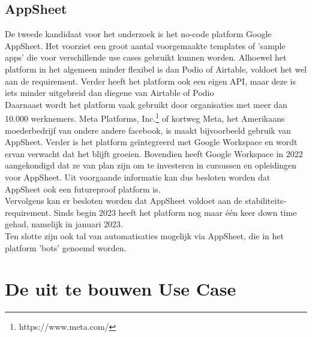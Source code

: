 \subsection{AppSheet} %

De tweede kandidaat voor het onderzoek is het no-code platform Google AppSheet. Het voorziet een groot aantal voorgemaakte templates of 'sample apps' die voor verschillende use cases gebruikt kunnen worden. Alhoewel het platform in het algemeen minder flexibel is dan Podio of Airtable, voldoet het wel aan de requirement. Verder heeft het platform ook een eigen API, maar deze is iets minder uitgebreid dan diegene van Airtable of Podio \\

Daarnaast wordt het platform vaak gebruikt door organisaties met meer dan 10.000 werknemers. Meta Platforms, Inc.\footnote{https://www.meta.com/} of kortweg Meta, het Amerikaans moederbedrijf van ondere andere facebook, is maakt bijvoorbeeld gebruik van AppSheet. Verder is het platform geïntegreerd met Google Workspace en wordt ervan verwacht dat het blijft groeien. Bovendien heeft Google Workspace in 2022 aangekondigd dat ze van plan zijn om te investeren in cursussen en opleidingen voor AppSheet. Uit voorgaande informatie kan dus besloten worden dat AppSheet ook een futureproof platform is. \\ 

Vervolgens kan er besloten worden dat AppSheet voldoet aan de stabiliteits-requirement. Sinds begin 2023 heeft het platform nog maar één keer down time gehad, namelijk in januari 2023. \\

Ten slotte zijn ook tal van automatisaties mogelijk via AppSheet, die in het platform 'bots' genoemd worden. \\



\section{De uit te bouwen Use Case} %

